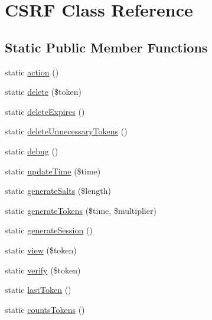 \hypertarget{class_zest_1_1_c_s_r_f_1_1_c_s_r_f}{}\section{C\+S\+RF Class Reference}
\label{class_zest_1_1_c_s_r_f_1_1_c_s_r_f}
\subsection*{Static Public Member Functions}
\begin{DoxyCompactItemize}
\item 
static \mbox{\hyperlink{class_zest_1_1_c_s_r_f_1_1_c_s_r_f_a6609de47ba599119a8e8bd3c8b51a66e}{action}} ()
\item 
static \mbox{\hyperlink{class_zest_1_1_c_s_r_f_1_1_c_s_r_f_a47cd58cb7dbe9901bd4a4b4c6d75d288}{delete}} (\$token)
\item 
static \mbox{\hyperlink{class_zest_1_1_c_s_r_f_1_1_c_s_r_f_ad6e098f8d854837403914ec1f8902472}{delete\+Expires}} ()
\item 
static \mbox{\hyperlink{class_zest_1_1_c_s_r_f_1_1_c_s_r_f_aeb10e0979295026dd368be917b70b5e5}{delete\+Unnecessary\+Tokens}} ()
\item 
static \mbox{\hyperlink{class_zest_1_1_c_s_r_f_1_1_c_s_r_f_a6f94454961915eeb8ddf6bf0286392c3}{debug}} ()
\item 
static \mbox{\hyperlink{class_zest_1_1_c_s_r_f_1_1_c_s_r_f_a32cfc547eef2579bd2b4865e13f25930}{update\+Time}} (\$time)
\item 
static \mbox{\hyperlink{class_zest_1_1_c_s_r_f_1_1_c_s_r_f_a991cb545814a29d8593b1c46c2a8648f}{generate\+Salts}} (\$length)
\item 
static \mbox{\hyperlink{class_zest_1_1_c_s_r_f_1_1_c_s_r_f_aaa90673f6609f67f97a05bad95d078ee}{generate\+Tokens}} (\$time, \$multiplier)
\item 
static \mbox{\hyperlink{class_zest_1_1_c_s_r_f_1_1_c_s_r_f_a45ff5e99e50937cf210eabc7f3919584}{generate\+Session}} ()
\item 
static \mbox{\hyperlink{class_zest_1_1_c_s_r_f_1_1_c_s_r_f_a484a7b8eae4958fe973f16c7ef6051bb}{view}} (\$token)
\item 
static \mbox{\hyperlink{class_zest_1_1_c_s_r_f_1_1_c_s_r_f_ab7694821487b65d0fad9b72ed03c8139}{verify}} (\$token)
\item 
static \mbox{\hyperlink{class_zest_1_1_c_s_r_f_1_1_c_s_r_f_a5c5700df3bc7ab94e9001ffe92672ab8}{last\+Token}} ()
\item 
static \mbox{\hyperlink{class_zest_1_1_c_s_r_f_1_1_c_s_r_f_ad3f7dbd55bdeb9ef76f6f2f7062ae5b3}{counts\+Tokens}} ()
\end{DoxyCompactItemize}


